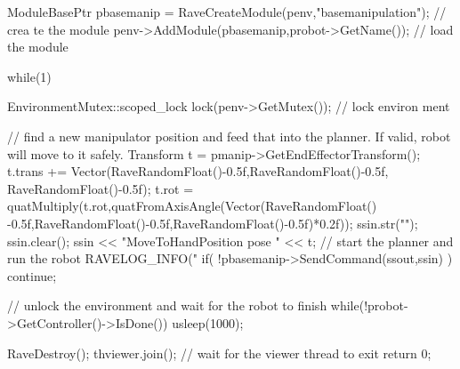 \begin{DoxyCodeInclude}
{    ModuleBasePtr pbasemanip = RaveCreateModule(penv,"basemanipulation"); // crea
      te the module
    penv->AddModule(pbasemanip,probot->GetName()); // load the module

    while(1) {
        {
            EnvironmentMutex::scoped_lock lock(penv->GetMutex()); // lock environ
      ment

            // find a new manipulator position and feed that into the planner. If
       valid, robot will move to it safely.
            Transform t = pmanip->GetEndEffectorTransform();
            t.trans += Vector(RaveRandomFloat()-0.5f,RaveRandomFloat()-0.5f,
      RaveRandomFloat()-0.5f);
            t.rot = quatMultiply(t.rot,quatFromAxisAngle(Vector(RaveRandomFloat()
      -0.5f,RaveRandomFloat()-0.5f,RaveRandomFloat()-0.5f)*0.2f));
            ssin.str("");
            ssin.clear();
            ssin << "MoveToHandPosition pose " << t;
            // start the planner and run the robot
            RAVELOG_INFO("%
            if( !pbasemanip->SendCommand(ssout,ssin) ) {
                continue;
            }
        }

        // unlock the environment and wait for the robot to finish
        while(!probot->GetController()->IsDone()) {
            usleep(1000);
        }
    }

    RaveDestroy();
    thviewer.join(); // wait for the viewer thread to exit
    return 0;
}
\end{DoxyCodeInclude}
 